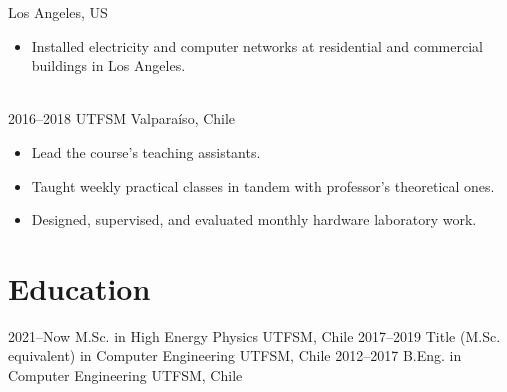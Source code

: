 \documentclass[a4paper]{cv-style}
\begin{document}
\begin{entrylist}
            {Los Angeles, US}
            {
            \begin{itemize}
                \item
                    Installed electricity and computer networks at residential and commercial buildings in Los Angeles.
            \end{itemize}} \\
        \entry
            {2016--2018}
            {UTFSM}
            {Valpara\'iso, Chile}
            {
            \begin{itemize}
                \item
                    Lead the course's teaching assistants.
                \item
                    Taught weekly practical classes in tandem with professor's theoretical ones.
                \item
                    Designed, supervised, and evaluated monthly hardware laboratory work.
            \end{itemize}}
    \end{entrylist}

\section{Education}
    \begin{entrylist}
        \entry
            {2021--Now}
            {M.Sc. {\normalfont in High Energy Physics}}
            {UTFSM, Chile}
            {\vspace{-0.3cm}}
        \entry
            {2017--2019}
            {Title (M.Sc. equivalent) {\normalfont in Computer Engineering}}
            {UTFSM, Chile}
            {\vspace{-0.3cm}}
        \entry
            {2012--2017}
            {B.Eng. {\normalfont in Computer Engineering}}
            {UTFSM, Chile}
            {\vspace{-0.3cm}}
    \end{entrylist}

\pagebreak
\end{document}
